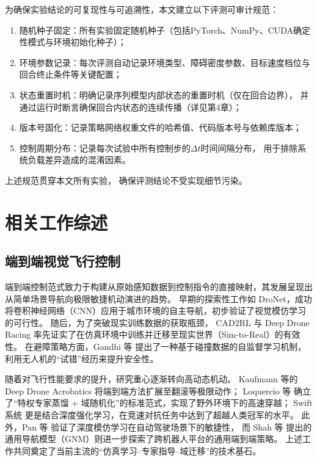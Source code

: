 为确保实验结论的可复现性与可追溯性，本文建立以下评测可审计规范：
\begin{enumerate}
\item 随机种子固定：所有实验固定随机种子（包括PyTorch、NumPy、CUDA确定性模式与环境初始化种子）；
 \item 环境参数记录：每次评测自动记录环境类型、障碍密度参数、目标速度档位与回合终止条件等关键配置；
 \item 状态重置时机：明确记录序列模型内部状态的重置时机（仅在回合边界），
并通过运行时断言确保回合内状态的连续传播（详见第4章）；
 \item 版本号固化：记录策略网络权重文件的哈希值、代码版本号与依赖库版本；
 \item 控制周期分布：记录每次试验中所有控制步的$\Delta t$时间间隔分布，
用于排除系统负载差异造成的混淆因素。
 \end{enumerate}

上述规范贯穿本文所有实验，
确保评测结论不受实现细节污染。


\section{相关工作综述}

\subsection{端到端视觉飞行控制}

端到端控制范式致力于构建从原始感知数据到控制指令的直接映射，其发展呈现出从简单场景导航向极限敏捷机动演进的趋势。
早期的探索性工作如 DroNet\cite{Loquercio2018DroNet}，成功将卷积神经网络（CNN）应用于城市环境的自主导航，初步验证了视觉模仿学习的可行性。
随后，为了突破现实训练数据的获取瓶颈，
CAD2RL\cite{Sadeghi2017CAD2RL} 与 Deep Drone Racing\cite{Kaufmann2018DeepDroneRacing} 率先证实了在仿真环境中训练并迁移至现实世界（Sim-to-Real）的有效性。
在避障策略方面，Gandhi 等\cite{Gandhi2017CollisionDrone} 提出了一种基于碰撞数据的自监督学习机制，利用无人机的“试错”经历来提升安全性。

随着对飞行性能要求的提升，研究重心逐渐转向高动态机动。
Kaufmann 等的 Deep Drone Acrobatics\cite{Kaufmann2020DeepDroneAcrobatics} 将端到端方法扩展至翻滚等极限动作；
Loquercio 等\cite{Loquercio2021HighSpeedWild} 确立了“特权专家蒸馏 + 域随机化”的标准范式，实现了野外环境下的高速穿越；
Swift 系统\cite{Kaufmann2023SwiftNature} 更是结合深度强化学习，在竞速对抗任务中达到了超越人类冠军的水平。
此外，Pan 等\cite{Pan2018AgileAutonomous} 验证了深度模仿学习在自动驾驶场景下的敏捷性，
而 Shah 等\cite{Shah2023GNM} 提出的通用导航模型（GNM）则进一步探索了跨机器人平台的通用端到端策略。
上述工作共同奠定了当前主流的“仿真学习--专家指导--域迁移”的技术基石。

